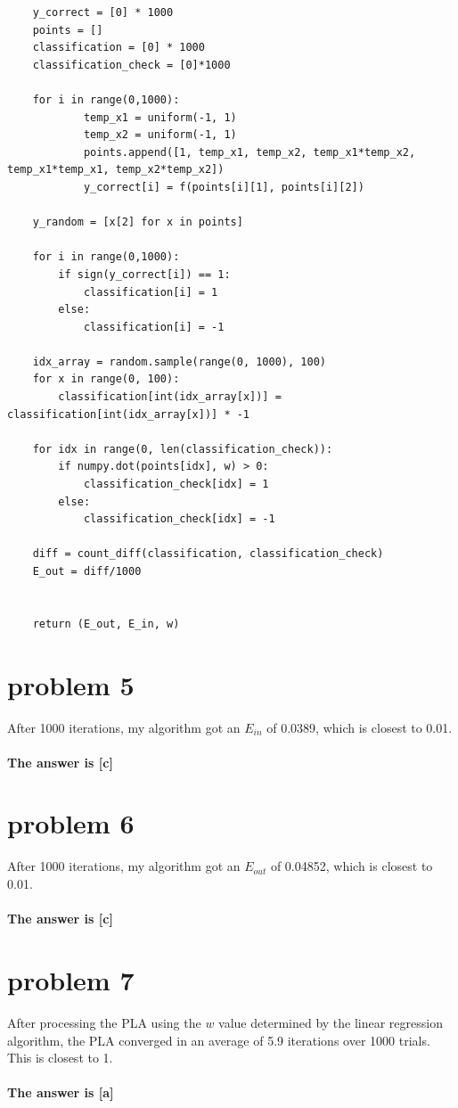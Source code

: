 \documentclass{article}
\begin{document}
\begin{verbatim}
    y_correct = [0] * 1000
    points = []
    classification = [0] * 1000
    classification_check = [0]*1000

    for i in range(0,1000):
            temp_x1 = uniform(-1, 1)
            temp_x2 = uniform(-1, 1)
            points.append([1, temp_x1, temp_x2, temp_x1*temp_x2, temp_x1*temp_x1, temp_x2*temp_x2])
            y_correct[i] = f(points[i][1], points[i][2])
    
    y_random = [x[2] for x in points] 

    for i in range(0,1000):
        if sign(y_correct[i]) == 1:
            classification[i] = 1
        else:
            classification[i] = -1
    
    idx_array = random.sample(range(0, 1000), 100)
    for x in range(0, 100):
        classification[int(idx_array[x])] = classification[int(idx_array[x])] * -1

    for idx in range(0, len(classification_check)):
        if numpy.dot(points[idx], w) > 0:
            classification_check[idx] = 1
        else:
            classification_check[idx] = -1
                
    diff = count_diff(classification, classification_check)
    E_out = diff/1000

            
    return (E_out, E_in, w)
\end{verbatim}

\section*{problem 5}
After 1000 iterations, my algorithm got an $E_{in}$ of 0.0389, which is closest to 0.01.\\\\
\textbf{The answer is [c]}

\section*{problem 6}
After 1000 iterations, my algorithm got an $E_{out}$ of 0.04852, which is closest to 0.01.\\\\
\textbf{The answer is [c]}

\section*{problem 7}
After processing the PLA using the $w$ value determined by the linear regression algorithm, the PLA converged in an average of 5.9 iterations over 1000 trials. This is closest to 1.\\\\
\textbf{The answer is [a]}
\end{document}
